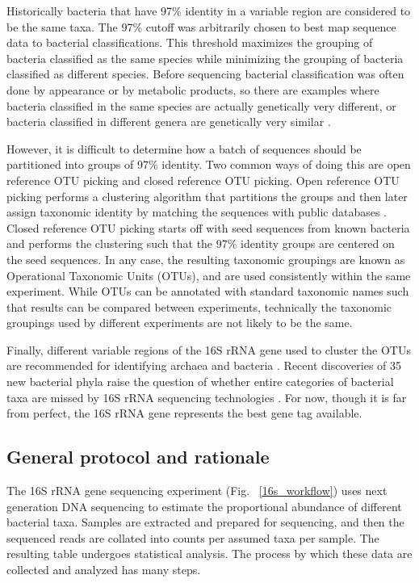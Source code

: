 Historically bacteria that have 97\% identity in a variable region are considered to be the same taxa. The 97\% cutoff was arbitrarily chosen to best map sequence data to bacterial classifications. This threshold maximizes the grouping of bacteria classified as the same species while minimizing the grouping of bacteria classified as different species. Before sequencing bacterial classification was often done by appearance or by metabolic products, so there are examples where bacteria classified in the same species are actually genetically very different, or bacteria classified in different genera are genetically very similar \cite{ciccarelli2006toward}.

However, it is difficult to determine how a batch of sequences should be partitioned into groups of 97\% identity. Two common ways of doing this are open reference OTU picking \cite{rideout2014subsampled} and closed reference OTU picking. Open reference OTU picking performs a clustering algorithm that partitions the groups and then later assign taxonomic identity by matching the sequences with public databases \cite{edgar2013uparse}. Closed reference OTU picking starts off with seed sequences from known bacteria and performs the clustering such that the 97\% identity groups are centered on the seed sequences. In any case, the resulting taxonomic groupings are known as Operational Taxonomic Units (OTUs), and are used consistently within the same experiment. While OTUs can be annotated with standard taxonomic names such that results can be compared between experiments, technically the taxonomic groupings used by different experiments are not likely to be the same.

Finally, different variable regions of the 16S rRNA gene used to cluster the OTUs are recommended for identifying archaea and bacteria \cite{kim2011evaluation}. Recent discoveries of 35 new bacterial phyla raise the question of whether entire categories of bacterial taxa are missed by 16S rRNA sequencing technologies \cite{hug2016new}. For now, though it is far from perfect, the 16S rRNA gene represents the best gene tag available.

\subsection{General protocol and rationale}
The 16S rRNA gene sequencing experiment (Fig. ~\ref{16s_workflow}) uses next generation DNA sequencing to estimate the proportional abundance of different bacterial taxa. Samples are extracted and prepared for sequencing, and then the sequenced reads are collated into counts per assumed taxa per sample. The resulting table undergoes statistical analysis. The process by which these data are collected and analyzed has many steps.

